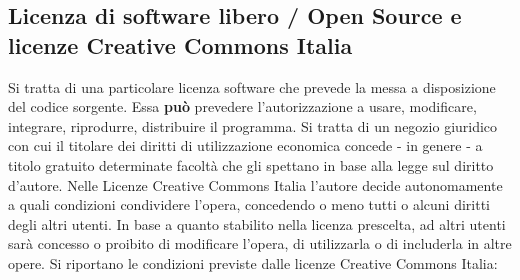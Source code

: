 \subsection{Licenza di software libero / Open Source e licenze Creative Commons Italia}
Si tratta di una particolare licenza software che prevede la messa a disposizione del codice sorgente. Essa \textbf{può} prevedere
l'autorizzazione a usare, modificare, integrare, riprodurre, distribuire il programma. \newline
Si tratta di un negozio giuridico con cui il titolare dei diritti di utilizzazione economica concede - in genere -
a titolo gratuito determinate facoltà che gli spettano in base alla legge sul diritto d'autore. \newline\newline
Nelle Licenze Creative Commons Italia l'autore decide autonomamente a quali condizioni condividere l'opera, concedendo
o meno tutti o alcuni diritti degli altri utenti.\newline
In base a quanto stabilito nella licenza prescelta, ad altri utenti sarà concesso o proibito di modificare l'opera, di utilizzarla o di includerla
in altre opere.\newline
Si riportano le condizioni previste dalle licenze Creative Commons Italia:
